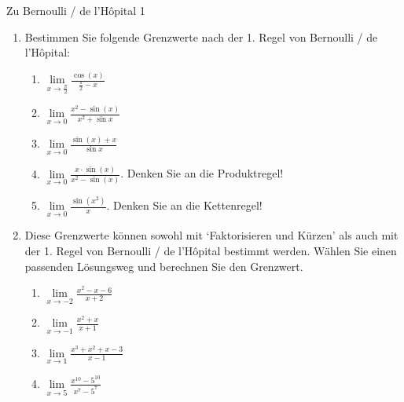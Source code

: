 \begin{ueb}
    {Zu Bernoulli / de l'Hôpital 1}{}


 \begin{enumerate}
    \item Bestimmen Sie folgende Grenzwerte nach der 1. Regel von Bernoulli / de l'Hôpital:
    \begin{enumerate}
        \item $\lim\limits_{x \to \frac{\pi}{2}} \frac{\cos(x)}{\frac{\pi}{2} - x}$
        \item $\lim\limits_{x \to 0} \frac{x^2 - \sin (x)}{x^2 + \sin x}$
        \item $\lim\limits_{x \to 0} \frac{\sin(x) + x}{\sin x}$
        \item $\lim\limits_{x \to 0} \frac{x \cdot \sin(x)}{x^2 - \sin(x)}$. Denken Sie an die Produktregel!
        \item $\lim\limits_{x \to 0} \frac{\sin(x^2)}{x}$. Denken Sie an die Kettenregel!
    \end{enumerate}
    
    \item Diese Grenzwerte können sowohl mit `Faktorisieren und Kürzen' als auch mit der 1. Regel von Bernoulli / de l'Hôpital bestimmt werden. Wählen Sie einen passenden Lösungsweg und berechnen Sie den Grenzwert.
    \begin{enumerate}
        \item $\lim\limits_{x \to -2} \frac{x^2 - x - 6}{x + 2}$
        \item $\lim\limits_{x \to -1} \frac{x^2 + x}{x + 1}$
        \item $\lim\limits_{x \to 1} \frac{x^3+x^2 + x - 3}{x - 1}$
        
        \item $\lim\limits_{x \to 5} \frac{x^{10} - 5^{10}}{x^7 - 5^7}$
    \end{enumerate}
    
    

\end{enumerate}
\end{ueb}
